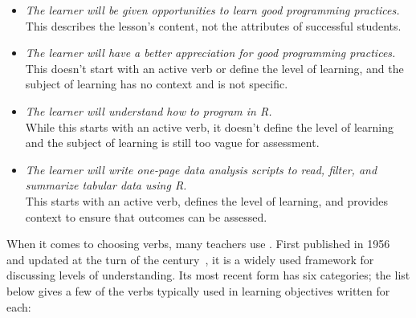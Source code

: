 \begin{itemize}

\item
  \emph{The learner will be given opportunities to learn good programming practices.}\\
  This describes the lesson's content,
  not the attributes of successful students.\\

\item
  \emph{The learner will have a better appreciation for good programming practices.}\\
  This doesn't start with an active verb or define the level of learning,
  and the subject of learning has no context and is not specific.\\

\item
  \emph{The learner will understand how to program in R.}\\
  While this starts with an active verb,
  it doesn't define the level of learning
  and the subject of learning is still too vague for assessment.\\

\item
  \emph{The learner will write one-page data analysis scripts to read, filter, and summarize tabular data using R.}\\
  This starts with an active verb,
  defines the level of learning,
  and provides context to ensure that outcomes can be assessed.

\end{itemize}

When it comes to choosing verbs,
many teachers use .
First published in 1956 and updated at the turn of the century~\cite{Ande2001},
it is a widely used framework for discussing levels of understanding.
Its most recent form has six categories;
the list below gives a few of the verbs typically used in learning objectives written for each:

